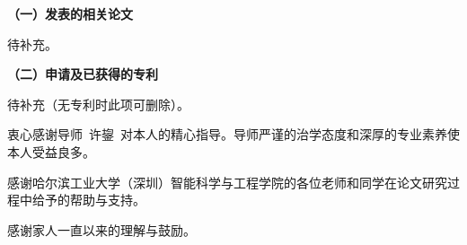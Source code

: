 \documentclass[fontset=fandol,type=master,campus=shenzhen,etitleauto=true]{hithesisbook}
\begin{document}
\begin{publication}
\noindent\textbf{（一）发表的相关论文}
\begin{publist}
\item 待补充。
\end{publist}

\noindent\textbf{（二）申请及已获得的专利}
\begin{publist}
\item 待补充（无专利时此项可删除）。
\end{publist}
\end{publication}

\authorization

\begin{acknowledgements}
衷心感谢导师~许鋆~对本人的精心指导。导师严谨的治学态度和深厚的专业素养使本人受益良多。

感谢哈尔滨工业大学（深圳）智能科学与工程学院的各位老师和同学在论文研究过程中给予的帮助与支持。

感谢家人一直以来的理解与鼓励。
\end{acknowledgements}
\end{document}
